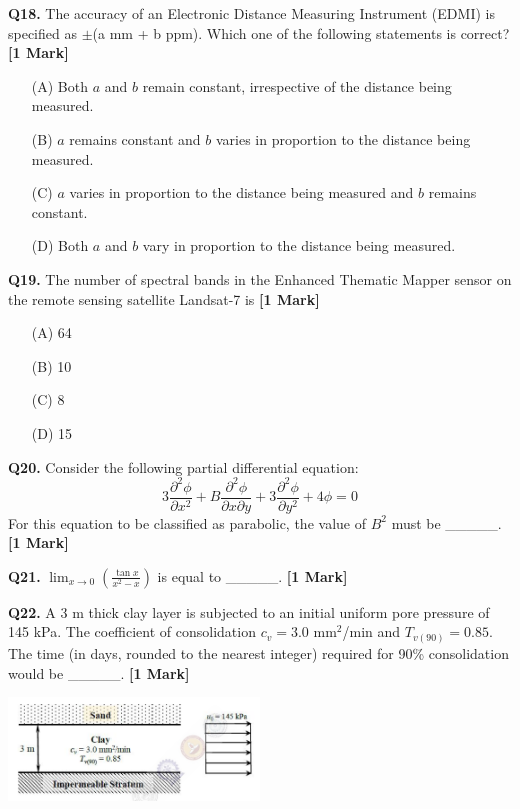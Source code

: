 \documentclass[11pt]{article}
\newcommand{\questiona}[2]{
    \noindent\textbf{Q#2.} #1 \hfill \textbf{[1 Mark]}
}
\begin{document}
\questiona{The accuracy of an Electronic Distance Measuring Instrument (EDMI) is specified as $\pm$(a mm + b ppm). Which one of the following statements is correct?}{18}
\begin{enumerate}
    \item[(A)] Both $a$ and $b$ remain constant, irrespective of the distance being measured.
    \item[(B)] $a$ remains constant and $b$ varies in proportion to the distance being measured.
    \item[(C)] $a$ varies in proportion to the distance being measured and $b$ remains constant.
    \item[(D)] Both $a$ and $b$ vary in proportion to the distance being measured.
\end{enumerate}

\vspace{0.5cm}

\questiona{The number of spectral bands in the Enhanced Thematic Mapper sensor on the remote sensing satellite Landsat-7 is}{19}
\begin{enumerate}
    \item[(A)] 64
    \item[(B)] 10
    \item[(C)] 8
    \item[(D)] 15
\end{enumerate}

\vspace{0.5cm}

\questiona{Consider the following partial differential equation:
\[3 \frac{\partial^2 \phi}{\partial x^2} + B \frac{\partial^2 \phi}{\partial x \partial y} + 3 \frac{\partial^2 \phi}{\partial y^2} + 4 \phi = 0\]
For this equation to be classified as parabolic, the value of $B^2$ must be \_\_\_\_\_.}{20}

\vspace{0.5cm}

\questiona{$\lim_{x \to 0} \left( \frac{\tan x}{x^2 - x} \right)$ is equal to \_\_\_\_\_.}{21}

\vspace{0.5cm}

\questiona{A 3 m thick clay layer is subjected to an initial uniform pore pressure of 145 kPa. The coefficient of consolidation $c_v = 3.0$ mm$^2$/min and $T_{v(90)} = 0.85$. The time (in days, rounded to the nearest integer) required for 90\% consolidation would be \_\_\_\_\_.}{22}
\begin{center}
\includegraphics[width=0.5\textwidth]{figures/22.png}
\end{center}
\end{document}
